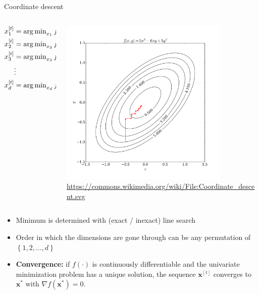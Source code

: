 \documentclass[11pt,compress,t,notes=noshow, xcolor=table]{beamer}
\begin{document}
\begin{vbframe}{Coordinate descent}
\begin{columns}
\begin{column}{.4\textwidth}
    \begin{scriptsize}
\begin{align*}
x^{[t]}_1 &= \operatorname{arg\,min}_{x_1} f(x_1, x^{[t-1]}_2, x^{[t-1]}_3, \hdots, x^{[t-1]}_d) \\
x^{[t]}_2 &= \operatorname{arg\,min}_{x_2} f(x^{[t]}_1, x_2, x^{[t-1]}_3, \hdots, x^{[t-1]}_d) \\
x^{[t]}_3 &= \operatorname{arg\,min}_{x_3} f(x^{[t]}_1, x^{[t]}_2, x_3, \hdots, x^{[t-1]}_d) \\
&\vdots \\
x^{[t]}_d &= \operatorname{arg\,min}_{x_d} f(x^{[t]}_1, x^{[t]}_2, x^{[t]}_3, \hdots, x_d) \\
\end{align*}
\end{scriptsize}
\end{column}
\begin{column}{.5\textwidth}
\begin{center}
\vspace*{-0.3cm}
\includegraphics[width=0.8\textwidth]{figure_man/Coordinate_descent.png} \\
\tiny{\url{https://commons.wikimedia.org/wiki/File:Coordinate_descent.svg}}
\end{center}\end{column}
\end{columns}

\framebreak

\begin{itemize}
\item Minimum is determined with (exact / inexact) line search
\item Order in which the dimensions are gone through can be any permutation of $\left\{1,2,\hdots,d\right\}$
\item \textbf{Convergence:} if $f(\cdot)$ is continuously differentiable and the univariate minimization problem has a unique
solution, the sequence $\bm{x}^{[t]}$ converges to $\bm{x}^{*}$ with $\nabla f(\bm{x}^*) = 0$.


\end{itemize}
\end{vbframe}
\end{document}
